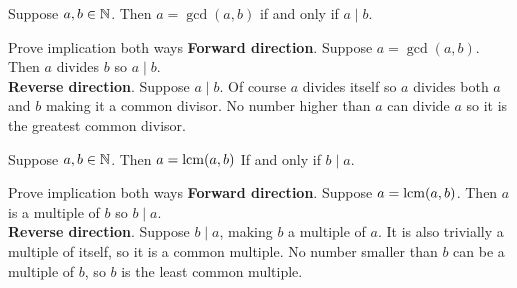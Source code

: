 \documentclass{article}
\begin{document}
\begin{problem}
Suppose \(a, b \in \mathbb{N}\). Then \(a = \gcd(a, b)\) if and only if \(a \mid b\).
\end{problem}
\begin{solution}{Prove implication both ways}
  \textbf{Forward direction}. Suppose \(a = \gcd(a, b)\). Then \(a\) divides \(b\) so \(a \mid b\).
  \\

  \textbf{Reverse direction}. Suppose \(a \mid b\). Of course \(a\) divides itself so \(a\) divides both \(a\) and \(b\) making it a common divisor. No number higher than \(a\) can divide \(a\) so it is the greatest common divisor.
\end{solution}
\begin{problem}
Suppose \(a, b \in \mathbb{N}\). Then \(a = \operatorname{lcm}(a, b)\) If and only if \(b \mid a\).
\end{problem}
\begin{solution}{Prove implication both ways}
  \textbf{Forward direction}. Suppose \(a = \operatorname{lcm}(a, b)\). Then \(a\) is a multiple of \(b\) so \(b \mid a\).
  \\

  \textbf{Reverse direction}. Suppose \(b \mid a\), making \(b\) a multiple of \(a\). It is also trivially a multiple of itself, so it is a common multiple. No number smaller than \(b\) can be a multiple of \(b\), so \(b\) is the least common multiple.
\end{solution}
\end{document}
